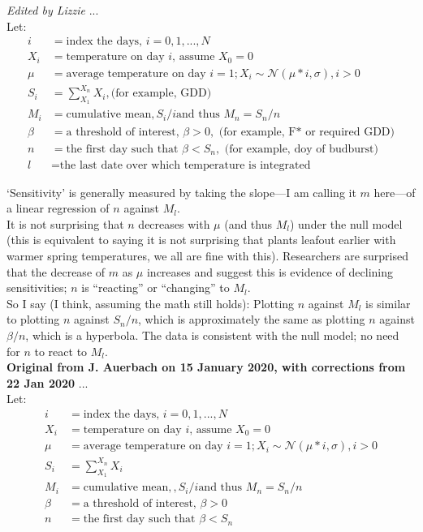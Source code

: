 \documentclass[11pt,letter]{article}
\begin{document}
\emph{Edited by Lizzie} ...\\
Let:
\begin{align*}
i & = \text{index the days, }  i = 0, 1, ..., N\\
X_i & = \text{temperature on day $i$, assume } X_0 = 0\\
\mu & = \text{average temperature on day } i = 1; X_i \sim \mathcal{N}(\mu * i, \sigma), i > 0\\
S_i & = \sum_{X_1}^{X_n} X_i,  \text{(for example, GDD)}\\
M_i & = \text{cumulative mean}, S_i / i \text{and thus } M_n=S_n/n \\
\beta & = \text{a threshold of interest, } \beta > 0, \text{ (for example, F* or required GDD)}\\
n &  = \text{the first day such that }  \beta < S_n, \text{ (for example, doy of budburst)}\\
l &  = \text{the last date over which temperature is integrated}
\end{align*}

`Sensitivity' is generally measured by taking the slope---I am calling it $m$ here---of a linear regression of $n$ against $M_l$.\\

It is not surprising that $n$ decreases with $\mu$ (and thus $M_l$) under the null model (this is equivalent to saying it is not surprising that plants leafout earlier with warmer spring temperatures, we all are fine with this). Researchers are surprised that the decrease of $m$ as $\mu$ increases and suggest this is evidence of declining sensitivities; $n$ is ``reacting'' or ``changing'' to $M_l$.\\

So I say (I think, assuming the math still holds): Plotting $n$ against $M_l$ is similar to plotting $n$ against $S_n / n$, which is approximately the same as plotting $n$ against $\beta/n$, which is a hyperbola. The data is consistent with the null model; no need for $n$ to react to $M_l$.\\

\newpage
{\bf Original from J. Auerbach on 15 January 2020, with corrections from 22 Jan 2020} ...\\
Let:
\begin{align*}
i & = \text{index the days, }  i = 0, 1, ..., N\\
X_i & = \text{temperature on day $i$, assume } X_0 = 0\\
\mu & = \text{average temperature on day } i = 1; X_i \sim \mathcal{N}(\mu * i, \sigma), i > 0\\
S_i & = \sum_{X_1}^{X_n} X_i \\
M_i & = \text{cumulative mean}, , S_i / i \text{and thus } M_n=S_n/n  \\
\beta & = \text{a threshold of interest, } \beta > 0\\
n &  = \text{the first day such that }  \beta < S_n
\end{align*}
\end{document}
